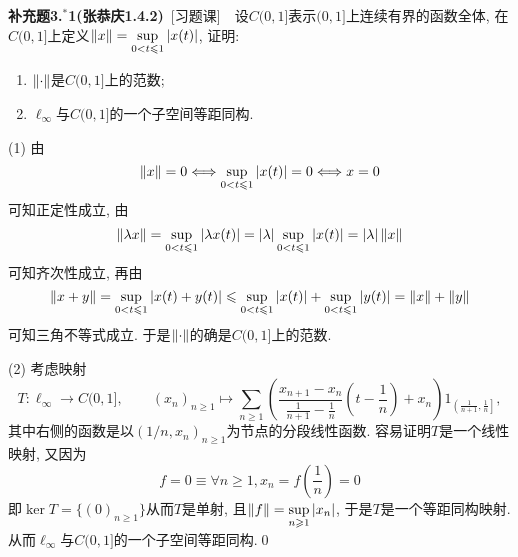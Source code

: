 	\textbf{补充题3.$ ^* $1(张恭庆1.4.2)}\ [习题课]\ \ 设$ C(0,1] $表示$ (0,1] $上连续有界的函数全体, 在$ C(0,1] $上定义$ \left\| x \right\|=\sup\limits_{0<t\leqslant 1}\left| x(t) \right|  $, 证明:
	\begin{enumerate}[(1)]
	\item $ \left\| \cdot \right\| $是$ C(0,1] $上的范数;
	\item $ \ell_\infty $与$ C(0,1] $的一个子空间等距同构.
	\end{enumerate}
	
	\begin{Proof}
	(1) 由
	\[
	\left\| x \right\|=0\Longleftrightarrow\sup_{0<t\leqslant 1}\left| x(t) \right| =0\Longleftrightarrow x=0
	\]
	可知正定性成立, 由
	\[
	\left\| \lambda x \right\|=\sup_{0<t\leqslant 1}\left| \lambda x(t) \right| =\left| \lambda \right| \sup_{0<t\leqslant 1}\left| x(t) \right| =\left| \lambda \right| \left\| x \right\|
	\]
	可知齐次性成立, 再由
	\[
	\left\| x+y \right\|=\sup_{0<t\leqslant 1}\left| x(t)+y(t) \right| \leqslant\sup_{0<t\leqslant 1}\left| x(t) \right| +\sup_{0<t\leqslant 1}\left| y(t) \right| =\left\| x \right\|+\left\| y \right\|
	\]
	可知三角不等式成立. 于是$ \left\| \cdot \right\| $的确是$ C(0,1] $上的范数.
	
	(2) 考虑映射
	\[
	T : \ell_\infty\to C(0,1],\qquad (x_n)_{n\geqslant 1}\mapsto\sum_{n\geqslant 1}\left(\frac{x_{n+1}-x_n}{\frac{1}{n+1}-\frac{1}{n}}\left(t-\frac{1}{n}\right)+x_n\right)1_{\left( \frac{1}{n+1},\frac{1}{n} \right]},
	\]
	其中右侧的函数是以$ (1/n,x_n)_{n\geqslant 1} $为节点的分段线性函数. 容易证明$ T $是一个线性映射, 又因为
	\[
	f=0\equiv \forall n\geqslant 1, x_n=f\left(\frac{1}{n}\right)=0
	\]
	即$ \ker T=\{ (0)_{n\geqslant 1} \} $从而$ T $是单射, 且$ \left\| f \right\|=\sup\limits_{n\geqslant 1}\left| x_n \right|  $, 于是$ T $是一个等距同构映射. 从而$ \ell_\infty $与$ C(0,1] $的一个子空间等距同构.\qed
	\end{Proof}